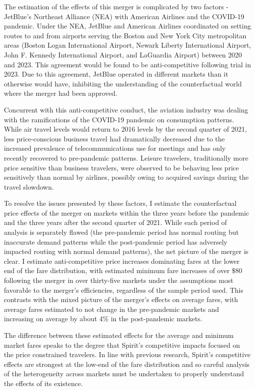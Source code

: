 \documentclass{article}
\begin{document}
    The estimation of the effects of this merger is complicated by two factors - JetBlue's Northeast Alliance (NEA) with American Airlines and the COVID-19 pandemic. Under the NEA, JetBlue and American Airlines coordinated on setting routes to and from airports serving the Boston and New York City metropolitan areas (Boston Logan International Airport, Newark Liberty International Airport, John F. Kennedy International Airport, and LaGuardia Airport) between 2020 and 2023. This agreement would be found to be anti-competitive following trial in 2023. Due to this agreement, JetBlue operated in different markets than it otherwise would have, inhibiting the understanding of the counterfactual world where the merger had been approved.

    Concurrent with this anti-competitive conduct, the aviation industry was dealing with the ramifications of the COVID-19 pandemic on consumption patterns. While air travel levels would return to 2016 levels by the second quarter of 2021, less price-conscious business travel had dramatically decreased due to the increased prevalence of telecommunications use for meetings and has only recently recovered to pre-pandemic patterns. Leisure travelers, traditionally more price sensitive than business travelers, were observed to be behaving less price sensitively than normal by airlines, possibly owing to acquired savings during the travel slowdown.

    To resolve the issues presented by these factors, I estimate the counterfactual price effects of the merger on markets within the three years before the pandemic and the three years after the second quarter of 2021. While each period of analysis is separately flawed (the pre-pandemic period has normal routing but inaccurate demand patterns while the post-pandemic period has adversely impacted routing with normal demand patterns), the net picture of the merger is clear. I estimate anti-competitive price increases dominating fares at the lower end of the fare distribution, with estimated minimum fare increases of over \$80 following the merger in over thirty-five markets under the assumptions most favorable to the merger's efficiencies, regardless of the sample period used. This contrasts with the mixed picture of the merger's effects on average fares, with average fares estimated to not change in the pre-pandemic markets and increasing on average by about 4\% in the post-pandemic markets. 

    The difference between these estimated effects for the average and minimum market fares speaks to the degree that Spirit's competitive impacts focused on the price constrained travelers. In line with previous research, Spirit's competitive effects are strongest at the low-end of the fare distribution and so careful analysis of the heterogeneity across markets must be undertaken to properly understand the effects of its existence. 
    
\end{document}
